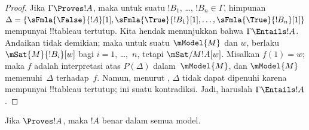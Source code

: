 \documentclass[../../../include/open-logic-section]{subfiles}
\begin{document}
\begin{proof}
  Jika $\Gamma \Proves !A$, maka untuk suatu $!B_1$, \dots, $!B_n \in
  \Gamma$, himpunan
  $\Delta = \{\sFmla{\False}{!A}[1], \sFmla{\True}{!B_1}[1],
  \dots, \sFmla{\True}{!B_n}[1]\}$ mempunyai !!{tableau} tertutup. Kita
  hendak menunjukkan bahwa $\Gamma \Entails !A$. Andaikan tidak demikian;
  maka untuk suatu $\mModel{M}$ dan $w$, berlaku
  $\mSat{M}{!B_i}[w]$ bagi $i=1$, \dots,~$n$, tetapi
  $\mSat/{M}{!A}[w]$. Misalkan $f(1) = w$; maka $f$ adalah interpretasi atas
  $P(\Delta)$ dalam~$\mModel{M}$, dan $\mModel{M}$ memenuhi~$\Delta$
  terhadap~$f$. Namun, menurut , $\Delta$
  tidak dapat dipenuhi karena mempunyai !!{tableau} tertutup; ini suatu
  kontradiksi. Jadi, haruslah $\Gamma \Entails !A$.
\end{proof}

\begin{cor}
Jika $\Proves !A$, maka $!A$ benar dalam semua model.
\end{cor}
\end{document}

